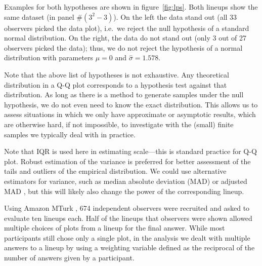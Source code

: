 \documentclass{article}\usepackage[]{graphicx}\usepackage[]{color}
\newcommand{\alnote}[1]{\todo[inline,color=green!40]{#1}}
\begin{document}

Examples for both hypotheses are shown in figure~\ref{fig:lps}. Both lineups show the same dataset (in panel \#$(3^2-3)$). On the left the data stand out (all 33 observers picked the data plot), i.e.~we reject the null hypothesis of a standard normal distribution. On the right, the data do not stand out (only 3 out of 27 observers picked the data); thus, we do not reject the hypothesis of a normal distribution with parameters $\mu=0$ and $\widehat{\sigma}=1.578$. 

Note that the above list of hypotheses is not exhaustive. Any theoretical distribution in a Q-Q plot corresponds to a  hypothesis test against that distribution. As long as there is a method to generate samples under the null hypothesis, we do not even need to know the exact distribution. This allows us to assess situations in which we only have approximate or asymptotic results, which are otherwise hard, if not impossible, to investigate  with the (small) finite samples we typically deal with in practice.

Note that IQR is used here in estimating scale---this is standard practice for Q-Q plot. Robust estimation of the variance is preferred for better assessment of the tails and outliers of the empirical distribution. We could use alternative estimators for variance, such as median absolute deviation (MAD) or adjusted MAD \citep{rousseeuw}, but this will likely also change the power of the corresponding lineup.



Using  Amazon MTurk \citep{amazon}, 674 independent observers were recruited and asked to evaluate ten lineups each. 
%
Half of the lineups that observers were shown allowed multiple choices of plots from a lineup for the final answer. While most participants still chose only a single plot, in the analysis we dealt with multiple answers to a lineup by using a weighting variable defined as the reciprocal of the number of answers given by a participant.
\end{document}
